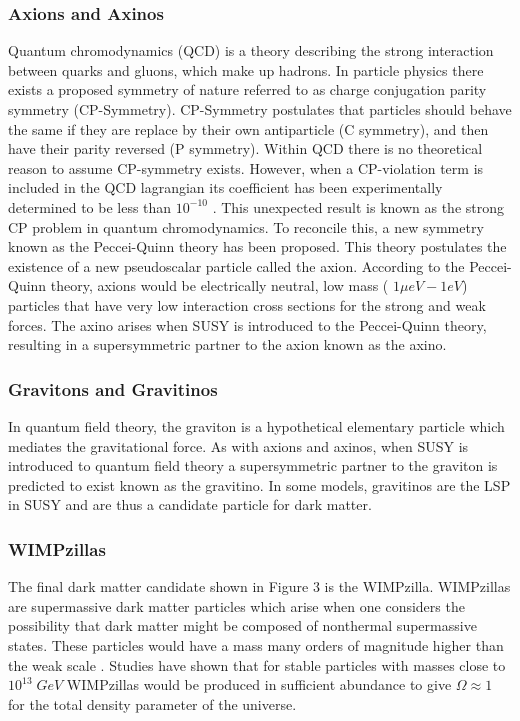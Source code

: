 \documentclass[a4paper,12pt]{article}
\begin{document}
\subsubsection{Axions and Axinos}
Quantum chromodynamics (QCD) is a theory describing the strong interaction between quarks and gluons, which make up hadrons.  In particle physics there exists a proposed symmetry of nature referred to as charge conjugation parity symmetry (CP-Symmetry).  CP-Symmetry postulates that particles should behave the same if they are replace by their own antiparticle (C symmetry), and then have their parity reversed (P symmetry). Within QCD there is no theoretical reason to assume CP-symmetry exists.  However, when a CP-violation term is included in the QCD lagrangian its coefficient has been experimentally determined to be less than $10^{-10}$ \cite{Baluni}. This unexpected result is known as the strong CP problem in quantum chromodynamics.    To reconcile this, a new symmetry known as the Peccei-Quinn theory has been proposed.  This theory postulates the existence of a new pseudoscalar particle called the axion.  According to the Peccei-Quinn theory, axions would be electrically neutral, low mass ( $1\mu eV - 1 eV$) particles that have very low interaction cross sections for the strong and weak forces.  The axino arises when SUSY is introduced to the Peccei-Quinn theory, resulting in a supersymmetric partner to the axion known as the axino.

\subsubsection{Gravitons and Gravitinos}
In quantum field theory, the graviton is a hypothetical  elementary particle which mediates the gravitational force.  As with axions and axinos, when SUSY is introduced to quantum field theory a supersymmetric partner to the graviton is predicted to exist known as the gravitino.  In some models, gravitinos are the LSP in SUSY and are thus a candidate particle for dark matter.

\subsubsection{WIMPzillas}
The final dark matter candidate shown in Figure 3 is the WIMPzilla.  WIMPzillas are supermassive dark matter particles which arise when one considers the possibility that dark matter might be composed of nonthermal supermassive states. These particles would have a mass many orders of magnitude higher than the weak scale \cite{Chung}. Studies have shown that for stable particles with masses close to $10^{13} \; GeV$  WIMPzillas would be produced in sufficient abundance to give $\Omega \approx 1$ for the total density parameter of the universe.  
\end{document}
